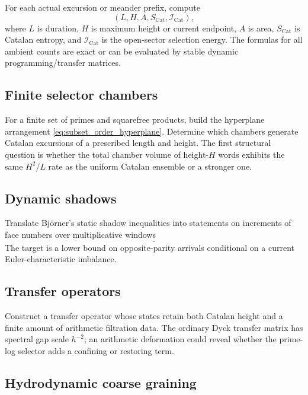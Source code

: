 \documentclass[11pt]{amsart}
\numberwithin{equation}{section}
\theoremstyle{plain}
\theoremstyle{definition}
\theoremstyle{remark}
\newcommand{\Icat}{\mathcal{I}_{\mathrm{Cat}}}
\begin{document}
For each actual excursion or meander prefix, compute
\begin{equation}
(L,H,A,S_{\mathrm{Cat}},\Icat),
\label{eq:finite_observables}
\end{equation}
where $L$ is duration, $H$ is maximum height or current endpoint, $A$ is area, $S_{\mathrm{Cat}}$ is Catalan entropy, and $\Icat$ is the open-sector selection energy.  The formulas for all ambient counts are exact or can be evaluated by stable dynamic programming/transfer matrices.

\subsection{Finite selector chambers}
\label{subsec:program_chambers}

For a finite set of primes and squarefree products, build the hyperplane arrangement \eqref{eq:subset_order_hyperplane}.  Determine which chambers generate Catalan excursions of a prescribed length and height.  The first structural question is whether the total chamber volume of height-$H$ words exhibits the same $H^2/L$ rate as the uniform Catalan ensemble or a stronger one.

\subsection{Dynamic shadows}
\label{subsec:program_shadows}

Translate Bj\"orner's static shadow inequalities into statements on increments of face numbers over multiplicative windows
\begin{equation}
[x,xe^{\delta}].
\label{eq:multiplicative_window}
\end{equation}
The target is a lower bound on opposite-parity arrivals conditional on a current Euler-characteristic imbalance.

\subsection{Transfer operators}
\label{subsec:program_transfer}

Construct a transfer operator whose states retain both Catalan height and a finite amount of arithmetic filtration data.  The ordinary Dyck transfer matrix has spectral gap scale $h^{-2}$; an arithmetic deformation could reveal whether the prime-log selector adds a confining or restoring term.

\subsection{Hydrodynamic coarse graining}
\label{subsec:program_hydrodynamic}
\end{document}
